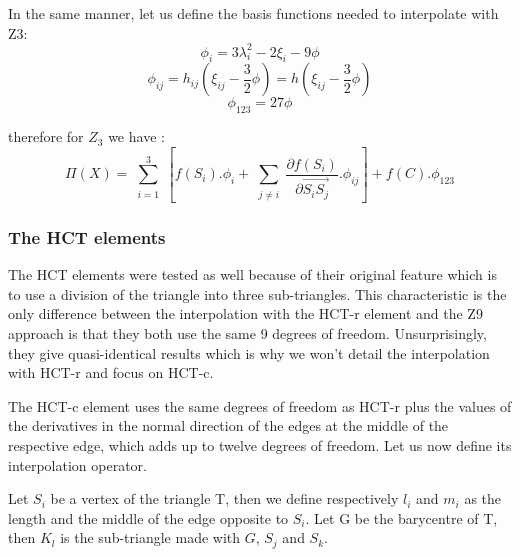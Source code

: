 \documentclass[proc]{edpsmath}
\begin{document}
\noindent In the same manner, let us define the basis functions needed to interpolate with Z3: 
\begin{equation*}
\phi_i = 3\lambda_{i}^2 -2 \xi_i - 9 \phi
\end{equation*}
\begin{equation*}
\phi_{ij} = h_{ij} (\xi_{ij} -\frac{3}{2}\phi)=h (\xi_{ij} -\frac{3}{2}\phi)
\end{equation*}
\begin{equation*}
\phi_{123}=27\phi
\end{equation*}

\noindent therefore for $Z_3$ we have :
\begin{equation*}
 \Pi (X) = \sum \limits_{\substack{i=1 }}^{3}{ [f(S_i).\phi_i + \sum \limits_{\substack{j\neq i }}^{}{ \frac{\partial f(S_i)}{\partial  \overrightarrow{ S_i S_j } }.\phi_{ij} } ] } + f(C).\phi_{123}
\end{equation*}

\subsubsection{The HCT elements}
The HCT elements were tested as well because of their original feature which is to use a division of the triangle into three sub-triangles.
This characteristic is the only difference between the interpolation with the HCT-r element and the  Z9 approach is that they both use the same 9 degrees of freedom. Unsurprisingly, they give quasi-identical results which is why we won't detail the interpolation with HCT-r and focus on HCT-c.

The HCT-c  element uses the same degrees of freedom as HCT-r plus the values of the derivatives in the normal direction of the edges at the middle of the respective edge, which adds up to twelve degrees of freedom. Let us now define its interpolation operator.

Let $S_i$ be a vertex of the triangle T, then we define respectively $l_i$ and $m_i$ as the length and the middle of the edge opposite to $S_i$. Let G be the barycentre of T, then $K_l$ is the sub-triangle made with $G$, $S_j$ and $S_k$.

\end{document}
